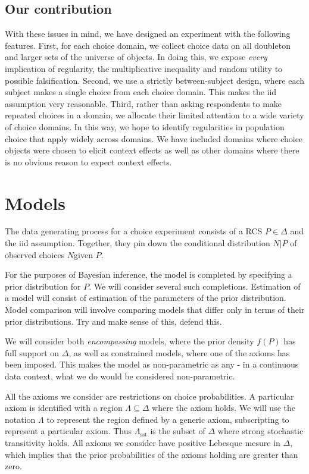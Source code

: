\documentclass[11pt,letter]{article}
\begin{document}
\subsection{Our contribution}

With these issues in mind, we have designed an experiment with the following features.
First, for each choice domain, we collect choice data on all doubleton and larger sets of the universe of objects.
In doing this, we expose {\em every} implication of regularity, the multiplicative inequality and random utility to possible falsification.
Second, we use a strictly between-subject design, where each subject makes a single choice from each choice domain.
This makes the iid assumption very reasonable.
Third, rather than asking respondents to make repeated choices in a domain, we allocate their limited attention to a wide variety of choice domains.
In this way, we hope to identify regularities in population choice that apply widely across domains.
We have included domains where choice objects were chosen to elicit context effects as well as other domains where there is no obvious reason to expect context effects.

\section{Models}\label{s:models}

The data generating process for a choice experiment consists of a RCS $P \in \Delta$ and the iid assumption.
Together, they pin down the conditional distribution $N|P$ of observed choices $N$given $P$.

For the purposes of Bayesian inference, the model is completed by specifying a prior distribution for $P$.
We will consider several such completions.
Estimation of a model will consist of estimation of the parameters of the prior distribution.
Model comparison will involve comparing models that differ only in terms of their prior distributions.
Try and make sense of this, defend this.

We will consider both {\em encompassing} models, where the prior density $f(P)$ has full support on $\Delta$, as well as constrained models, where one of the axioms has been imposed.
This makes the model as non-parametric as any - in a continuous data context, what we do would be considered non-parametric.

All the axioms we consider are restrictions on choice probabilities.
A particular axiom is identified with a region $\Lambda \subseteq \Delta$ where the axiom holds.
We will use the notation $\Lambda$ to represent the region defined by a generic axiom, subscripting to represent a particular axiom.
Thus $\Lambda_{\mathrm{sst}}$ is the subset of $\Delta$ where strong stochastic transitivity holds.
All axioms we consider have positive Lebesque mesure in $\Delta$, which implies that the prior probabilities of the axioms holding are greater than zero.
\end{document}
